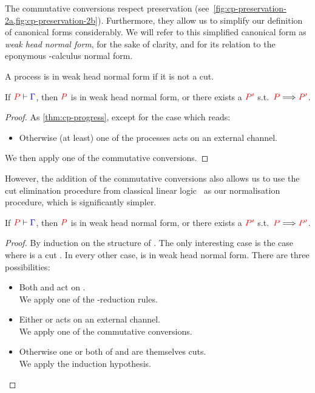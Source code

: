 
The commutative conversions respect preservation
(see~\cref{fig:cp-preservation-2a,fig:cp-preservation-2b}).
Furthermore, they allow us to simplify our definition of canonical forms
considerably.
We will refer to this simplified canonical form as \emph{weak head normal form},
for the sake of clarity, and for its relation to the eponymous
\textlambda-calculus normal form. 
\begin{definition}\label{def:cp-whnf-canonical-forms}
  A process  is in weak head normal form if it is not a cut.
\end{definition}
\begin{theorem}\label{thm:cp-whnf-progress-1}
  If $\seq[{ P }]{ \Gamma }$, then $\tm{P}$ is in weak head normal form, or
  there exists a $\tm{P'}$ s.t.\ $\reducesto{P}{P'}$. 
\end{theorem}
\begin{proof}
  As \cref{thm:cp-progress}, except for the case which reads:
  \begin{itemize}
  \item
    Otherwise (at least) one of the processes acts on an external channel.
  \end{itemize}
  We then apply one of the commutative conversions.
\end{proof}
However, the addition of the commutative conversions also allows us to use the
cut elimination procedure from classical linear logic~\cite{girard1987} as our
normalisation procedure, which is significantly simpler.
\begin{theorem}\label{thm:cp-whnf-progress-2}
  If $\seq[{ P }]{ \Gamma }$, then $\tm{P}$ is in weak head normal form, or
  there exists a $\tm{P'}$ s.t.\ $\reducesto{P}{P'}$.
\end{theorem}
\begin{proof}
  By induction on the structure of . The only interesting case is the
  case where  is a cut . In every other case,
   is in weak head normal form. There are three possibilities:
  \begin{itemize}
  \item
    Both  and  act on .
    \\
    We apply one of the \textbeta-reduction rules.
  \item
    Either  or  acts on an external channel.
    \\
    We apply one of the commutative conversions.
  \item
    Otherwise one or both of  and  are themselves cuts.
    \\
    We apply the induction hypothesis.
  \end{itemize}
\end{proof}
